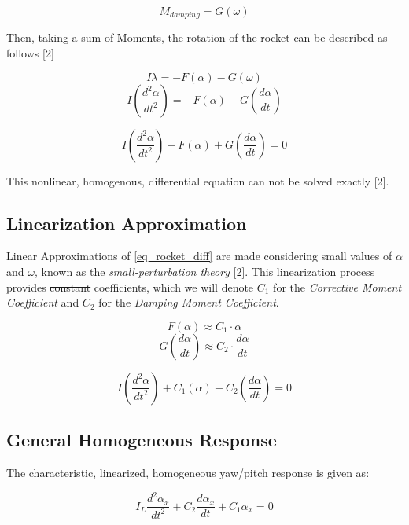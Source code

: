 \documentclass[]{article}
\begin{document}
\begin{equation}
M_{damping} = G (\omega)
\end{equation}

Then, taking a sum of Moments, the rotation of the rocket can be
described as follows {[}2{]}

\[
I \lambda = -F(\alpha) - G(\omega) 
\] \[
I \left( \dfrac{d^2\alpha}{dt^2} \right) = -F(\alpha) - G \left(\dfrac{d\alpha}{dt} \right) 
\]

\begin{equation}
\label{eq_rocket_diff}
I \left( \dfrac{d^2\alpha}{dt^2} \right) + F(\alpha) + G \left(\dfrac{d\alpha}{dt} \right) = 0
\end{equation}

This nonlinear, homogenous, differential equation can not be solved
exactly {[}2{]}.

\subsection{Linearization
Approximation}\label{linearization-approximation}

Linear Approximations of \ref{eq_rocket_diff} are made considering small
values of \(\alpha\) and \(\omega\), known as the
\emph{small-perturbation theory} {[}2{]}. This linearization process
provides \sout{constant} coefficients, which we will denote \(C_1\) for
the \emph{Corrective Moment Coefficient} and \(C_2\) for the
\emph{Damping Moment Coefficient}.

\[
F(\alpha) \approx C_1 \cdot \alpha 
\] \[
G \left(\dfrac{d\alpha}{dt} \right) \approx C_2 \cdot \dfrac{d\alpha}{dt} 
\]

\begin{equation}
\label{eq_rocket_diff_linearized}
I \left( \dfrac{d^2\alpha}{dt^2} \right) + C_1 (\alpha) + C_2 \left(\dfrac{d\alpha}{dt} \right) = 0
\end{equation}

\subsection{General Homogeneous
Response}\label{general-homogeneous-response}

The characteristic, linearized, homogeneous yaw/pitch response is given
as:

\begin{equation}
I_L \dfrac{d^2 \alpha_x}{dt^2} + C_2 \dfrac{d \alpha_x}{dt} + C_1 \alpha_x = 0
\end{equation}
\end{document}
